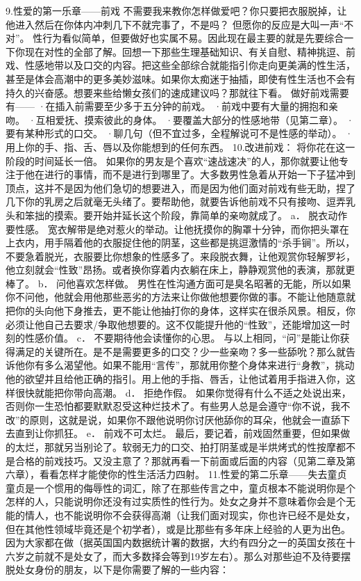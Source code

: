 \documentclass[12pt,UTF8,openany]{ctexbook}
\begin{document}
9.性爱的第一乐章——前戏
不需要我来教你怎样做爱吧？你只要把衣服脱掉，让他进入然后在你体内冲刺几下不就完事了，不是吗？
但愿你的反应是大叫一声“不对”。
性行为看似简单，但要做好也实属不易。因此现在最主要的就是先要综合一下你现在对性的全部了解。回想一下那些生理基础知识、有关自慰、精神挑逗、前戏、性感地带以及口交的内容。把这些全部综合就能指引你走向更美满的性生活，甚至是体会高潮中的更多美妙滋味。如果你太痴迷于抽插，即使有性生活也不会有持久的兴奋感。想要来些给懒女孩们的速成建议吗？那就往下看。
做好前戏需要有——
·在插入前需要至少多于五分钟的前戏。
·前戏中要有大量的拥抱和亲吻。
·互相爱抚、摸索彼此的身体。
·要覆盖大部分的性感地带（见第二章）。
·要有某种形式的口交。
·聊几句（但不宜过多，全程解说可不是性感的举动）。
·用上你的手、指、舌、唇以及你能想到的任何东西。
10.改进前戏：
将你花在这一阶段的时间延长一倍。
如果你的男友是个喜欢“速战速决”的人，那你就要让他专注于他在进行的事情，而不是进行到哪里了。大多数男性急着从开始一下子猛冲到顶点，这并不是因为他们急切的想要进入，而是因为他们面对前戏有些无助，捏了几下你的乳房之后就毫无头绪了。要帮助他，就要告诉他前戏不只有接吻、逗弄乳头和笨拙的摸索。要开始并延长这个阶段，靠简单的亲吻就成了。
a． 脱衣动作要性感。
宽衣解带是绝对惹火的举动。让他抚摸你的胸罩十分钟，而你把头罩在上衣内，用手隔着他的衣服捉住他的阴茎，这些都是挑逗激情的“杀手锏”。所以，不要急着脱光，衣服要比你想象的性感多了。来段脱衣舞，让他观赏你轻解罗衫，他立刻就会“性致”昂扬。或者换你穿着内衣躺在床上，静静观赏他的表演，那就更棒了。
b． 问他喜欢怎样做。
男性在性沟通方面可是臭名昭著的无能，所以如果你不问他，他就会用他那些恶劣的方法来让你做他想要你做的事。不能让他随意就把你的头向他下身推去，更不能让他抽打你的身体，这样实在很杀风景。相反，你必须让他自己去要求/争取他想要的。这不仅能提升他的“性致”，还能增加这一时刻的性感价值。
c． 不要期待他会读懂你的心思。
与以上相同，“问”是能让你获得满足的关键所在。是不是需要更多的口交？少一些亲吻？多一些舔吮？那么就告诉他你有多么渴望他。如果不能用“言传”，那就用你整个身体来进行“身教”，挑动他的欲望并且给他正确的指引。用上他的手指、唇舌，让他试着用手指进入你，这样很快就能把你带向高潮。
d． 拒绝作假。
如果你觉得有什么不适之处说出来，否则你一生恐怕都要默默忍受这种烂技术了。有些男人总是会遵守“你不说，我不改”的原则，这就是说，如果你不跟他说明你讨厌他舔你的耳朵，他就会一直舔下去直到让你抓狂。
e． 前戏不可太烂。
最后，要记着，前戏固然重要，但如果做的太烂，那就另当别论了。软弱无力的口交、拍打阴茎或是半烘烤式的性按摩都不是合格的前戏技巧。又没主意了？那就再看一下前面或后面的内容（见第二章及第六章），看看怎样才能使你的性生活活力四射。
11.性爱的第二乐章——失去童贞
童贞是一个惯用的侮辱性的词汇，除了在那些传言之中，童贞根本不能说明你是个怎样的人，只能说明你还没有过实质性的性行为。处女之身并不意味着你会是个无能的情人，也不能说明你不会获得高潮（让我们面对现实，你也许已经不是处女，但在其他性领域毕竟还是个初学者），或是比那些有多年床上经验的人更为出色。因为大家都在做（据英国国内数据统计署的数据，大约有四分之一的英国女孩在十六岁之前就不是处女了，而大多数择会等到19岁左右）。那么对那些迫不及待要摆脱处女身份的朋友，以下是你需要了解的一些内容：
\end{document}
